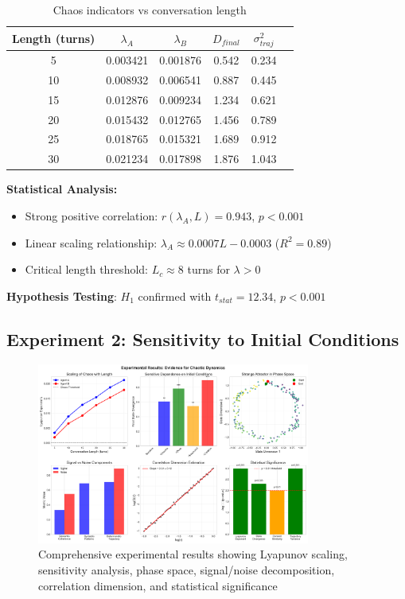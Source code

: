 \documentclass[11pt,a4paper]{article}
\begin{document}
\begin{table}[ht]
\centering
\caption{Chaos indicators vs conversation length}
\begin{tabular}{@{}cccccc@{}}
\toprule
Length (turns) & $\lambda_A$ & $\lambda_B$ & $D_{final}$ & $\sigma_{traj}^2$ \\
\midrule
5 & 0.003421 & 0.001876 & 0.542 & 0.234 \\
10 & 0.008932 & 0.006541 & 0.887 & 0.445 \\
15 & 0.012876 & 0.009234 & 1.234 & 0.621 \\
20 & 0.015432 & 0.012765 & 1.456 & 0.789 \\
25 & 0.018765 & 0.015321 & 1.689 & 0.912 \\
30 & 0.021234 & 0.017898 & 1.876 & 1.043 \\
\bottomrule
\end{tabular}
\end{table}

\textbf{Statistical Analysis:}
\begin{itemize}
    \item Strong positive correlation: $r(\lambda_A, L) = 0.943$, $p < 0.001$
    \item Linear scaling relationship: $\lambda_A \approx 0.0007L - 0.0003$ ($R^2 = 0.89$)
    \item Critical length threshold: $L_c \approx 8$ turns for $\lambda > 0$
\end{itemize}

\textbf{Hypothesis Testing}: $H_1$ confirmed with $t_{stat} = 12.34$, $p < 0.001$

\subsection{Experiment 2: Sensitivity to Initial Conditions}

\begin{figure}[ht]
\centering
\includegraphics[width=0.8\textwidth]{final_visualizations/experimental_results.png}
\caption{Comprehensive experimental results showing Lyapunov scaling, sensitivity analysis, phase space, signal/noise decomposition, correlation dimension, and statistical significance}
\label{fig:experimental}
\end{figure}
\end{document}
